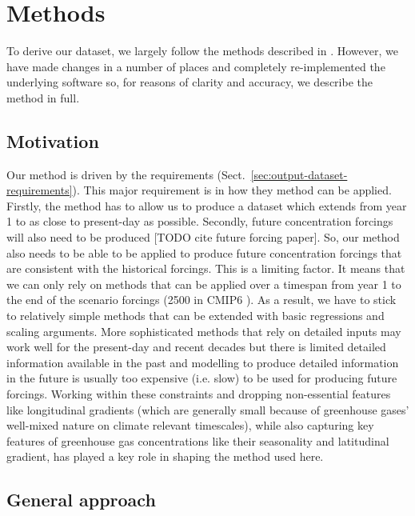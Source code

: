 \section{Methods}
\label{sec:methods}

To derive our dataset, we largely follow the methods described in \citet{meinshausen_historical-ghgs_2017}.
However, we have made changes in a number of places and completely re-implemented the underlying software so,
for reasons of clarity and accuracy, we describe the method in full.

\subsection{Motivation}
\label{ssec:methods-motivation}

Our method is driven by the requirements (Sect.~\ref{sec:output-dataset-requirements}).
This major requirement is in how they method can be applied.
Firstly, the method has to allow us to produce a dataset
which extends from year 1 to as close to present-day as possible.
Secondly, future concentration forcings will also need to be produced [TODO cite future forcing paper].
So, our method also needs to be able to be applied to produce future concentration forcings
that are consistent with the historical forcings.
This is a limiting factor.
It means that we can only rely on methods that can be applied over a timespan from year 1
to the end of the scenario forcings (2500 in CMIP6 \citealp{meinshausen_ssp-ghgs_2020}).
As a result, we have to stick to relatively simple methods
that can be extended with basic regressions and scaling arguments.
More sophisticated methods that rely on detailed inputs may work well for the present-day and recent decades
but there is limited detailed information available in the past
and modelling to produce detailed information in the future is usually too expensive (i.e. slow) to be used for producing future forcings.
Working within these constraints and dropping non-essential features like longitudinal gradients
(which are generally small because of greenhouse gases' well-mixed nature on climate relevant timescales),
while also capturing key features of greenhouse gas concentrations like their seasonality and latitudinal gradient,
has played a key role in shaping the method used here.

\subsection{General approach}
\label{ssec:methods-general-approach}

